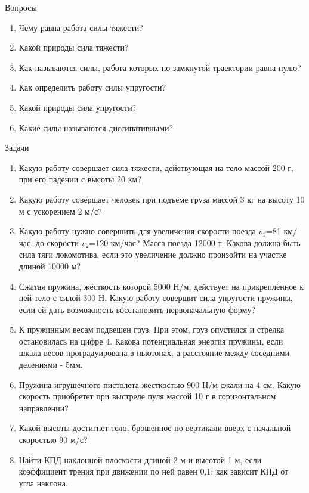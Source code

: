 \documentclass[a5paper, 10pt]{diss_4}
\renewcommand{\'}{\,'}
\begin{document}
\begin{center}
   Вопросы
\end{center}
\begin{enumerate}

\item Чему равна работа силы тяжести?
\item Какой природы сила тяжести?
\item Как называются силы, работа которых по замкнутой траектории равна нулю?
\item Как определить работу силы упругости?
\item Какой природы сила упругости?
\item Какие силы называются диссипативными?

\end{enumerate}

\begin{center}
   Задачи
\end{center}
\begin{enumerate}

\item Какую работу совершает сила тяжести, действующая на  тело массой 200 г, при его падении с высоты 20 км?
\item Какую работу совершает человек при подъёме груза массой 3 кг на высоту 10 м с ускорением 2 м/с?
\item Какую работу нужно совершить для увеличения скорости поезда $v_1$=81 км/час, до скорости $v_2$=120 км/час? Масса поезда 12000 т. Какова должна быть сила тяги локомотива, если это увеличение должно произойти на участке длиной 10000 м?
\item Сжатая пружина, жёсткость которой 5000 Н/м, действует на прикреплённое к ней тело с силой 300 Н. Какую работу совершит сила упругости пружины, если ей дать возможность восстановить первоначальную форму?
\item К пружинным весам подвешен груз. При этом, груз опустился и стрелка остановилась на цифре 4. Какова потенциальная энергия пружины, если шкала весов проградуирована в ньютонах, а расстояние между соседними делениями - 5мм.
\item Пружина игрушечного пистолета жесткостью 900 Н/м сжали на 4 см. Какую скорость приобретет при выстреле пуля массой 10 г в горизонтальном направлении?
\item Какой высоты достигнет тело, брошенное по вертикали вверх с начальной скоростью 90 м/с?
\item Найти КПД наклонной плоскости длиной 2 м и высотой 1 м, если коэффициент трения при движении по ней равен 0,1; как зависит КПД от угла наклона.

\end{enumerate}
\end{document}

